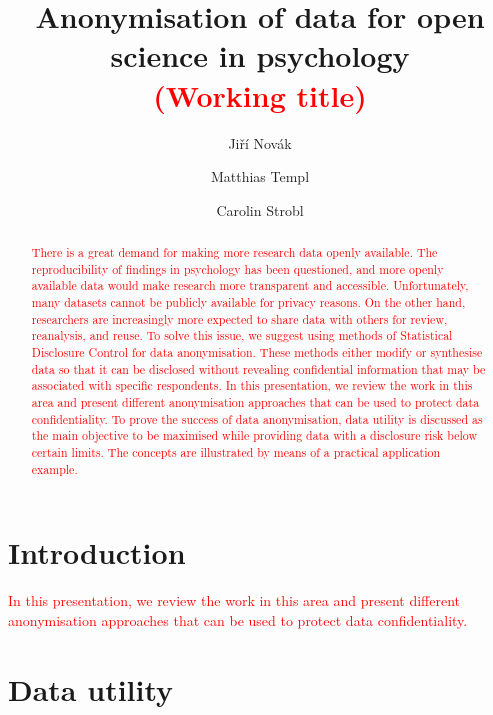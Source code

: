 \documentclass{article}
\title{Anonymisation of data for open science in psychology \\
\textcolor{red}{(Working title)} 
}
\author{Jiří Novák \and 
        Matthias Templ \and 
        Carolin Strobl
        }
\begin{document}
\maketitle

\begin{abstract}
\textcolor{red}{There is a great demand for making more research data openly available. The reproducibility of findings in psychology has been questioned, and more openly available data would make research more transparent and accessible. Unfortunately, many datasets cannot be publicly available for privacy reasons. On the other hand, researchers are increasingly more expected to share data with others for review, reanalysis, and reuse. To solve this issue, we suggest using methods of Statistical Disclosure Control for data anonymisation. These methods either modify or synthesise data so that it can be disclosed without revealing confidential information that may be associated with specific respondents. In this presentation, we review the work in this area and present different anonymisation approaches that can be used to protect data confidentiality. To prove the success of data anonymisation, data utility is discussed as the main objective to be maximised while providing data with a disclosure risk below certain limits. The concepts are illustrated by means of a practical application example.}
\end{abstract}


\section{Introduction}

\textcolor{red}{In this presentation, we review the work in this area and present different anonymisation approaches that can be used to protect data confidentiality.}

\section{Data utility}
\end{document}
